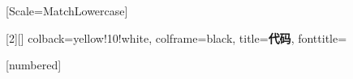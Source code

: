 \usepackage{fontspec} 
\setmonofont{CodeNewRomanNerdFontMono-Regular.otf}[Scale=MatchLowercase]
\usepackage{color} 
\usepackage{xcolor}



\usepackage{mathtools, amsmath, amsfonts, amsthm, latexsym} 

\usepackage{xcolor}
\usepackage[most]{tcolorbox} %

\newenvironment{mydef}{
  \stepcounter{defname}
  \begin{tcolorbox}[colframe=black, colback=blue!10, title=\textbf{定义 \arabic{defname}}]
}{
  \end{tcolorbox}
}

[2][]{%
  colback=yellow!10!white,      %
  colframe=black,                %
  title=\textbf{代码},           %
  fonttitle=\bfseries           %
}


\usepackage{xcolor} %

\usepackage{newtxtext,newtxmath}

\usepackage{caption} 

[numbered]

\usepackage{graphicx}  %
\usepackage{booktabs}

\usepackage{subfigure} 

\usepackage{multirow} 

\usepackage{array}

\usepackage{lscape} 

\usepackage{enumerate} 

\usepackage{tikz}
\usepackage{svg}
\usepackage{float}

\usepackage{natbib}

\usepackage{comment}

